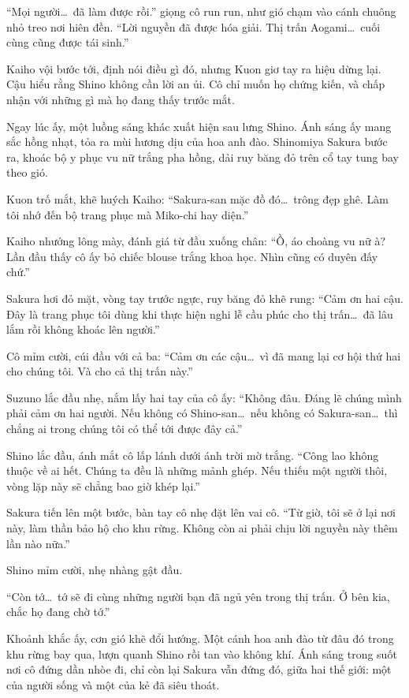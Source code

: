 \documentclass[../main.tex]{subfiles}
\begin{document}
``Mọi người\dots\ đã làm được rồi.'' giọng cô run run, như gió chạm vào cánh chuông nhỏ treo nơi hiên đền. ``Lời nguyền đã được hóa giải. Thị trấn Aogami\dots\ cuối cùng cũng được tái sinh.''

Kaiho vội bước tới, định nói điều gì đó, nhưng Kuon giơ tay ra hiệu dừng lại. Cậu hiểu rằng Shino không cần lời an ủi. Cô chỉ muốn họ chứng kiến, và chấp nhận với những gì mà họ đang thấy trước mắt.

Ngay lúc ấy, một luồng sáng khác xuất hiện sau lưng Shino. Ánh sáng ấy mang sắc hồng nhạt, tỏa ra mùi hương dịu của hoa anh đào. Shinomiya Sakura bước ra, khoác bộ y phục vu nữ trắng pha hồng, dải ruy băng đỏ trên cổ tay tung bay theo gió.

Kuon trố mắt, khẽ huých Kaiho: ``Sakura-san mặc đồ đó\dots\ trông đẹp ghê. Làm tôi nhớ đến bộ trang phục mà Miko-chi hay diện.''

Kaiho nhướng lông mày, đánh giá từ đầu xuống chân: ``Ồ, áo choàng vu nữ à? Lần đầu thấy cô ấy bỏ chiếc blouse trắng khoa học. Nhìn cũng có duyên đấy chứ.''

Sakura hơi đỏ mặt, vòng tay trước ngực, ruy băng đỏ khẽ rung: ``Cảm ơn hai cậu. Đây là trang phục tôi dùng khi thực hiện nghi lễ cầu phúc cho thị trấn\dots\ đã lâu lắm rồi không khoác lên người.''

Cô mỉm cười, cúi đầu với cả ba: ``Cảm ơn các cậu\dots\ vì đã mang lại cơ hội thứ hai cho chúng tôi. Và cho cả thị trấn này.''

Suzuno lắc đầu nhẹ, nắm lấy hai tay của cô ấy: ``Không đâu. Đáng lẽ chúng mình phải cảm ơn hai người. Nếu không có Shino-san\dots\ nếu không có Sakura-san\dots\ thì chẳng ai trong chúng tôi có thể tới được đây cả.''

Shino lắc đầu, ánh mắt cô lấp lánh dưới ánh trời mờ trắng. ``Công lao không thuộc về ai hết. Chúng ta đều là những mảnh ghép. Nếu thiếu một người thôi, vòng lặp này sẽ chẳng bao giờ khép lại.''

Sakura tiến lên một bước, bàn tay cô nhẹ đặt lên vai cô. ``Từ giờ, tôi sẽ ở lại nơi này, làm thần bảo hộ cho khu rừng. Không còn ai phải chịu lời nguyền này thêm lần nào nữa.''

Shino mỉm cười, nhẹ nhàng gật đầu.

``Còn tớ\dots\ tớ sẽ đi cùng những người bạn đã ngủ yên trong thị trấn. Ở bên kia, chắc họ đang chờ tớ.''

Khoảnh khắc ấy, cơn gió khẽ đổi hướng. Một cánh hoa anh đào từ đâu đó trong khu rừng  bay qua, lượn quanh Shino rồi tan vào không khí. Ánh sáng trong suốt nơi cô đứng dần nhòe đi, chỉ còn lại Sakura vẫn đứng đó, giữa hai thế giới: một của người sống và một của kẻ đã siêu thoát.
\end{document}
